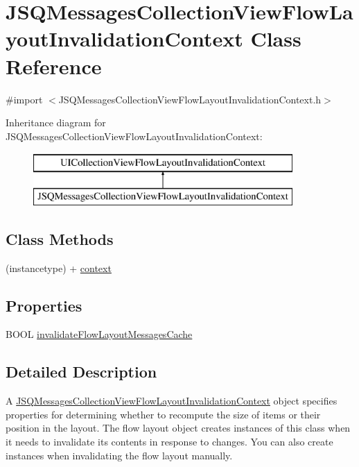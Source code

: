 \hypertarget{interface_j_s_q_messages_collection_view_flow_layout_invalidation_context}{}\section{J\+S\+Q\+Messages\+Collection\+View\+Flow\+Layout\+Invalidation\+Context Class Reference}
\label{interface_j_s_q_messages_collection_view_flow_layout_invalidation_context}


{\ttfamily \#import $<$J\+S\+Q\+Messages\+Collection\+View\+Flow\+Layout\+Invalidation\+Context.\+h$>$}

Inheritance diagram for J\+S\+Q\+Messages\+Collection\+View\+Flow\+Layout\+Invalidation\+Context\+:\begin{figure}[H]
\begin{center}
\leavevmode
\includegraphics[height=2.000000cm]{interface_j_s_q_messages_collection_view_flow_layout_invalidation_context}
\end{center}
\end{figure}
\subsection*{Class Methods}
\begin{DoxyCompactItemize}
\item 
(instancetype) + \hyperlink{interface_j_s_q_messages_collection_view_flow_layout_invalidation_context_a32a9727db994e6b186b50ae2c6721d44}{context}
\end{DoxyCompactItemize}
\subsection*{Properties}
\begin{DoxyCompactItemize}
\item 
B\+O\+O\+L \hyperlink{interface_j_s_q_messages_collection_view_flow_layout_invalidation_context_aa696f200fad5e62ff83ca423b369a20f}{invalidate\+Flow\+Layout\+Messages\+Cache}
\end{DoxyCompactItemize}


\subsection{Detailed Description}
A {\ttfamily \hyperlink{interface_j_s_q_messages_collection_view_flow_layout_invalidation_context}{J\+S\+Q\+Messages\+Collection\+View\+Flow\+Layout\+Invalidation\+Context}} object specifies properties for determining whether to recompute the size of items or their position in the layout. The flow layout object creates instances of this class when it needs to invalidate its contents in response to changes. You can also create instances when invalidating the flow layout manually. 

